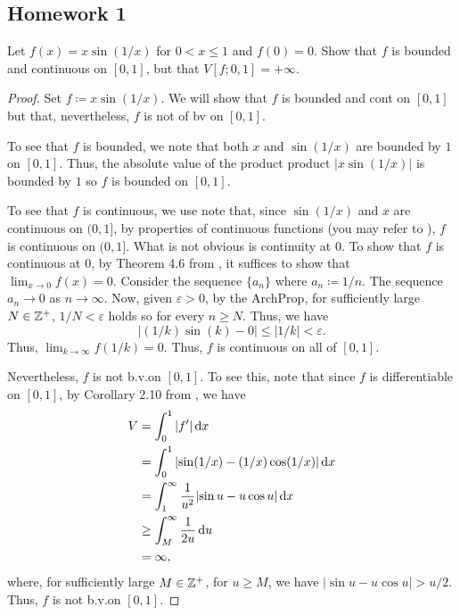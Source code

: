 \subsection{Homework 1}
\begin{problem}
Let $f(x)=x\sin(1/x)$ for $0<x\leq 1$ and $f(0)=0$. Show that $f$ is
bounded and continuous on $[0,1]$, but that $V[f;0,1]=+\infty$.
\end{problem}
\begin{proof}
 Set $f\coloneqq x\sin (1/x)$. We will show that $f$ is bounded and
 \gls{cont} on $[0,1]$ but that, nevertheless, $f$ is not of \gls{bv} on
 $[0,1]$.

 To see that $f$ is bounded, we note that both $x$ and $\sin(1/x)$ are
 bounded by $1$ on $[0,1]$. Thus, the absolute value of the product product
 $|{x\sin(1/x)}|$ is bounded by $1$ so $f$ is bounded on $[0,1]$.

 To see that $f$ is continuous, we use note that, since $\sin(1/x)$ and $x$
 are continuous on $(0,1]$, by properties of continuous functions (you may
 refer to \cite[Ch.\@ 4, p.\@ 87]{rudin-1}), $f$ is continuous on $(0,1]$.
 What is not obvious is continuity at $0$. To show that $f$ is continuous
 at $0$, by Theorem 4.6 from \cite[Ch.\@ 4, p.\@ 86]{rudin-1}, it suffices
 to show that $\lim_{x\to 0}f(x)=0$. Consider the sequence $\{a_n\}$ where
 $a_n\coloneqq 1/n$. The sequence $a_n\to 0$ as $n\to\infty$. Now, given
 $\varepsilon>0$, by the \gls{ArchProp}, for sufficiently  large
 $N\in\mathbb{Z}^+$, $1/N<\varepsilon$ holds so for every $n\geq N$. Thus, we have
 \begin{equation}
   \label{eq:1:1}
   |{(1/k)\sin(k)-0}|\leq
   |1/k|<\varepsilon.
 \end{equation}
 Thus, $\lim_{k\to\infty}f(1/k)=0$. Thus, $f$ is continuous on all of
 $[0,1]$.

 Nevertheless, $f$ is not b.v.\@ on $[0,1]$. To see this, note that since
 $f$ is differentiable on $[0,1]$, by Corollary 2.10 from \cite[Ch.\@ 2,
 p.\@ 23]{wheeden-zygmund}, we have
 \begin{equation}
   \label{eq:1:2}
   \begin{aligned}
     V&=\int_0^1|f'|\mathop{}\!\mathrm{d} x\\
     &=\int_0^1|{\sin(1/x)-(1/x)\cos(1/x)}|\mathop{}\!\mathrm{d} x\\
     &=\int_1^\infty\frac{1}{u^2}|{\sin u-u\cos u}|\mathop{}\!\mathrm{d} x\\
     &\geq\int_M^\infty \frac{1}{2u}\mathop{}\!\mathrm{d} u\\
     &=\infty,
   \end{aligned}
 \end{equation}
 where, for sufficiently large $M\in\mathbb{Z}^+$, for $u\geq M$, we have
 $|{\sin u- u\cos u}|>u/2$. Thus, $f$ is not b.v.\@ on $[0,1]$.
\end{proof}

